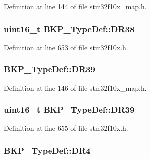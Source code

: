 Definition at line 144 of file stm32f10x\+\_\+map.\+h.

\subsubsection[{\texorpdfstring{D\+R38}{DR38}}]{ {\bf uint16\+\_\+t} B\+K\+P\+\_\+\+Type\+Def\+::\+D\+R38}\hypertarget{struct_b_k_p___type_def_accfaf41ee048545b7c9c0ed069165c6e}{}\label{struct_b_k_p___type_def_accfaf41ee048545b7c9c0ed069165c6e}


Definition at line 653 of file stm32f10x.\+h.

\subsubsection[{\texorpdfstring{D\+R39}{DR39}}]{ B\+K\+P\+\_\+\+Type\+Def\+::\+D\+R39}\hypertarget{struct_b_k_p___type_def_a25f6fcaadc4edf209447b406652497ca}{}\label{struct_b_k_p___type_def_a25f6fcaadc4edf209447b406652497ca}


Definition at line 146 of file stm32f10x\+\_\+map.\+h.

\subsubsection[{\texorpdfstring{D\+R39}{DR39}}]{ {\bf uint16\+\_\+t} B\+K\+P\+\_\+\+Type\+Def\+::\+D\+R39}\hypertarget{struct_b_k_p___type_def_a599452e0f9d6e1e1fa75730aec9228fd}{}\label{struct_b_k_p___type_def_a599452e0f9d6e1e1fa75730aec9228fd}


Definition at line 655 of file stm32f10x.\+h.

\subsubsection[{\texorpdfstring{D\+R4}{DR4}}]{ B\+K\+P\+\_\+\+Type\+Def\+::\+D\+R4}\hypertarget{struct_b_k_p___type_def_ab54fd9674a9f7c7cc5df417a282de140}{}\label{struct_b_k_p___type_def_ab54fd9674a9f7c7cc5df417a282de140}


